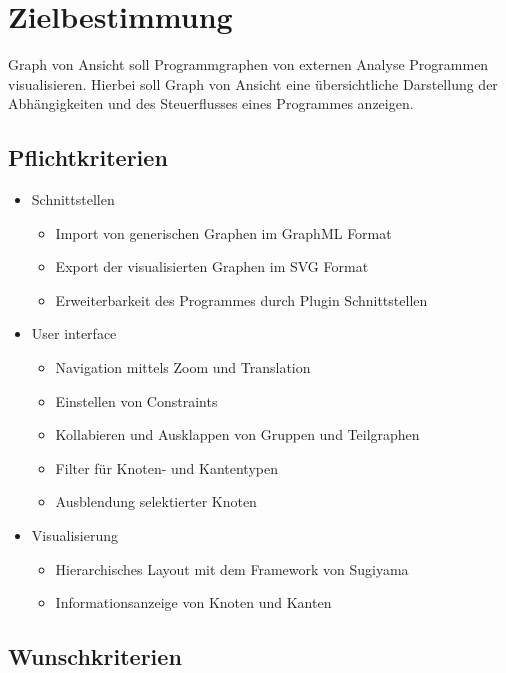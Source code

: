 \chapter{Zielbestimmung}

Graph von Ansicht soll Programmgraphen von externen Analyse Programmen visualisieren. Hierbei soll Graph von Ansicht eine übersichtliche Darstellung der Abhängigkeiten und des Steuerflusses eines Programmes anzeigen.

\section{Pflichtkriterien}

\begin{itemize}
\item Schnittstellen
\begin{itemize}
\item Import von generischen Graphen im GraphML Format
\item Export der visualisierten Graphen im SVG Format
\item Erweiterbarkeit des Programmes durch Plugin Schnittstellen
\end{itemize}
\item User interface
\begin{itemize}
\item Navigation mittels Zoom und Translation
\item Einstellen von Constraints
\item Kollabieren und Ausklappen von Gruppen und Teilgraphen
\item Filter für Knoten- und Kantentypen
\item Ausblendung selektierter Knoten
\end{itemize}
\item Visualisierung
\begin{itemize}
\item Hierarchisches Layout mit dem Framework von Sugiyama
\item Informationsanzeige von Knoten und Kanten
\end{itemize}
\end{itemize}

\section{Wunschkriterien}

